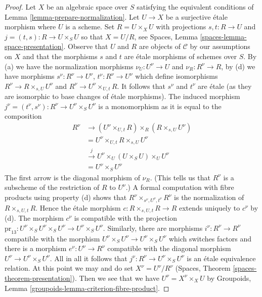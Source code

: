 \begin{proof}
\medskip\noindent
Let $X$ be an algebraic space over $S$ satisfying
the equivalent conditions of Lemma \ref{lemma-prepare-normalization}.
Let $U \to X$ be a surjective \'etale morphism where $U$ is a scheme.
Set $R = U \times_X U$ with projections $s, t : R \to U$ and
$j = (t, s) : R \to U \times_S U$ so that $X = U/R$, see
Spaces, Lemma \ref{spaces-lemma-space-presentation}.
Observe that $U$ and $R$ are objects of $\mathcal{C}$
by our assumptions on $X$ and that the morphisms
$s$ and $t$ are \'etale morphisms of schemes over $S$.
By (a) we have the normalization morphisms
$\nu_U : U^\nu \to U$ and $\nu_R : R^\nu \to R$,
by (d) we have morphisms $s^\nu : R^\nu \to U^\nu$,
$t^\nu : R^\nu \to U^\nu$ which define
isomorphisms $R^\nu \to R \times_{s, U} U^\nu$ and
$R^\nu \to U^\nu \times_{U, t} R$. It follows that
$s^\nu$ and $t^\nu$ are \'etale (as they are isomorphic
to base changes of \'etale morphisms). The induced morphism
$j^\nu = (t^\nu, s^\nu) : R^\nu \to U^\nu \times_S U^\nu$
is a monomorphism as it is equal to the composition
\begin{align*}
R^\nu
& \to
(U^\nu \times_{U, t} R) \times_R (R \times_{s, U} U^\nu) \\
& =
U^\nu \times_{U, t} R \times_{s, U} U^\nu \\
& \xrightarrow{j}
U^\nu \times_U (U \times_S U) \times_U U^\nu \\
& =
U^\nu \times_S U^\nu
\end{align*}
The first arrow is the diagonal morphism of $\nu_R$.
(This tells us that $R^\nu$ is a subscheme of the restriction of
$R$ to $U^\nu$.) A formal computation with fibre products
using property (d) shows that
$R^\nu \times_{s^\nu, U^\nu, t^\nu} R^\nu$ is the normalization
of $R \times_{s, U, t} R$. Hence the \'etale morphism
$c : R \times_{s, U, t} R \to R$ extends uniquely to $c^\nu$ by (d).
The morphism $c^\nu$ is compatible with the projection
$\text{pr}_{13} : U^\nu \times_S U^\nu \times_S U^\nu \to U^\nu \times_S U^\nu$.
Similarly, there are morphisms $i^\nu : R^\nu \to R^\nu$
compatible with the morphism $U^\nu \times_S U^\nu \to U^\nu \times_S U^\nu$
which switches factors and there is a morphism $e^\nu : U^\nu \to R^\nu$
compatible with the diagonal morphism $U^\nu \to U^\nu \times_S U^\nu$.
All in all it follows that $j^\nu : R^\nu \to U^\nu \times_S U^\nu$
is an \'etale equivalence relation.
At this point we may and do set $X^\nu = U^\nu/R^\nu$
(Spaces, Theorem \ref{spaces-theorem-presentation}).
Then we see that we have $U^\nu = X^\nu \times_X U$ by
Groupoids, Lemma \ref{groupoids-lemma-criterion-fibre-product}.


\end{proof}
